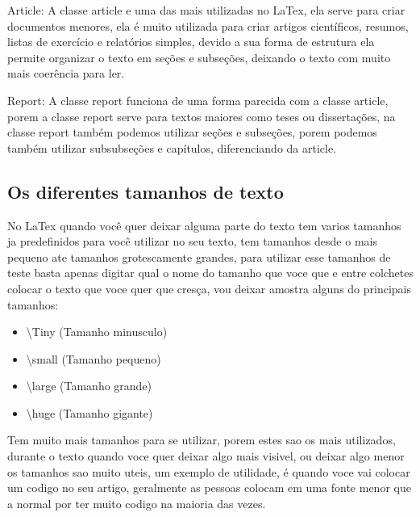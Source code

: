 Article: A classe article e uma das mais utilizadas no LaTex, ela serve para criar documentos menores, ela é muito utilizada para criar artigos científicos, resumos, listas de exercício e relatórios simples, devido a sua forma de estrutura ela permite organizar o texto em seções e subseções, deixando o texto com muito mais coerência para ler.


Report: A classe report funciona de uma forma parecida com a classe article, porem a classe report serve para textos maiores como teses ou dissertações, na classe report também podemos utilizar seções e subseções, porem podemos também utilizar subsubseções e capítulos, diferenciando da article. 


\subsection{Os diferentes tamanhos de texto}
No LaTex quando você quer deixar alguma parte do texto tem varios tamanhos ja predefinidos para você utilizar no seu texto, tem tamanhos desde o mais pequeno ate tamanhos grotescamente grandes, para utilizar esse tamanhos de teste basta apenas digitar qual o nome do tamanho que voce que e entre colchetes colocar o texto que voce quer que cresça, vou deixar amostra alguns do principais tamanhos:

\begin{itemize}
    \item \textbackslash Tiny (Tamanho minusculo)
    \item \textbackslash small (Tamanho pequeno)
    \item \textbackslash large (Tamanho grande)
    \item \textbackslash huge (Tamanho gigante)
\end{itemize}


Tem muito mais tamanhos para se utilizar, porem estes sao os mais utilizados, durante o texto quando voce quer deixar algo mais visivel, ou deixar algo menor os tamanhos sao muito uteis, um exemplo de utilidade, é quando voce vai colocar um codigo no seu artigo, geralmente as pessoas colocam em uma fonte menor que a normal por ter muito codigo na maioria das vezes. 













